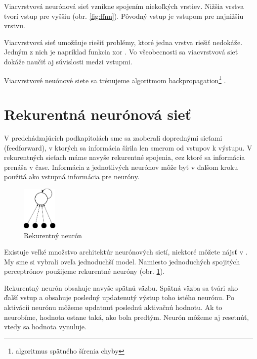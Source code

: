 Viacvrstvová neurónová sieť vznikne spojením niekoľkých vrstiev. Nižšia vrstva tvorí vstup pre vyššiu (obr. \ref{fig:ffnn}). Pôvodný vstup je vstupom pre najnižšiu vrstvu.

Viacvrstvová sieť umožňuje riešiť problémy, ktoré jedna vrstva riešiť nedokáže. Jedným z nich je napríklad funkcia xor \cite[s. 197]{haykin1999neural}. Vo všeobecnosti sa viacvrstvová sieť dokáže naučiť aj súvislosti medzi vstupmi.

Viacvrstvové neuónové siete sa trénujeme algoritmom backpropagation\footnote{algoritmus spätného šírenia chyby} \cite{haykin1999neural,dominika2011neural}.

\section{Rekurentná neurónová sieť}\label{chap:rnn}

V predchádzajúcich podkapitolách sme sa zaoberali doprednými sieťami (feedforward), v ktorých sa informácia šírila len smerom od vstupov k výstupu. V rekurentných sieťach máme navyše rekurentné spojenia, cez ktoré sa informácia prenáša v čase. Informácia z jednotlivých neurónov môže byť v ďalšom kroku použitá ako vstupná informácia pre neuróny.

\begin{figure}[htbp]
  \begin{center}
    \includegraphics[width=0.15\textwidth]{images/recneuron}
  \end{center}
  \caption{Rekurentný neurón}
  \label{fig:recurentneuron}
\end{figure}

Existuje veľké množstvo architektúr neurónových sietí, niektoré môžete nájsť v \cite[s. 755]{haykin1999neural}. My sme si vybrali oveľa jednoduchší model. Namiesto jednoduchých spojitých perceptrónov použijeme rekurentné neuróny (obr. \ref{fig:recurentneuron}).

Rekurentný neurón obsahuje navyše spätnú väzbu. Spätná väzba sa tvári ako ďalší vstup a obsahuje posledný updatenutý výstup toho istého neurónu. Po aktivácii neurónu môžeme updatnuť poslednú aktivačnú hodnotu. Ak to neurobíme, hodnota ostane taká, ako bola predtým. Neurón môžeme aj resetnúť, vtedy sa hodnota vynuluje.

